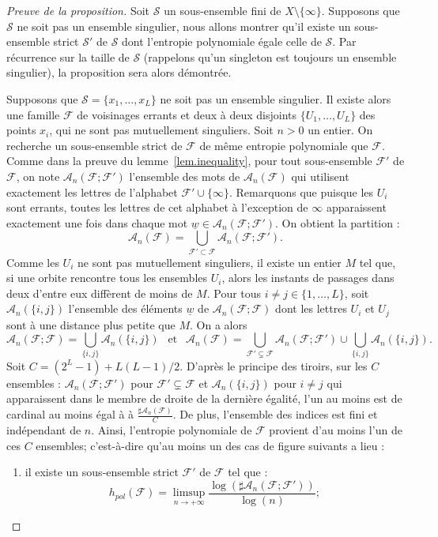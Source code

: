 \documentclass[11pt]{article}
\theoremstyle{definition}
\numberwithin{equation}{section}
\numberwithin{figure}{section}
\numberwithin{table}{section}
\newcommand*\cA{{\mathcal A}}
\newcommand*\cF{{\mathcal F}}
\newcommand*\cS{{\mathcal S}}
\begin{document}
\begin{proof}[Preuve de la proposition]
Soit $\cS$ un sous-ensemble fini de $X \setminus \{\infty\}$. Supposons que $\cS$ ne soit pas un ensemble singulier, nous allons montrer qu'il existe un sous-ensemble strict $\cS'$ de $\cS$ dont l'entropie polynomiale égale celle de $\cS$. Par récurrence sur la taille de $\cS$ (rappelons qu'un singleton est toujours un ensemble singulier), la proposition sera alors démontrée.

Supposons que $\cS=\{x_1, \dots, x_L\}$ ne soit pas un ensemble singulier. Il existe alors une famille $\cF$ de voisinages errants et deux à deux disjoints $\{U_1, \dots, U_L\}$ des points $x_i$, qui ne sont pas mutuellement singuliers. Soit $n>0$ un entier. On recherche un sous-ensemble strict de $\cF$ de même entropie polynomiale que $\cF$. Comme dans la preuve du lemme~\ref{lem.inequality}, pour tout sous-ensemble $\cF'$ de $\cF$, on note $\cA_n(\cF;\cF')$ l'ensemble des mots de $\cA_n(\cF)$ qui utilisent exactement les lettres de l'alphabet $\cF'\cup\{\infty\}$. Remarquons que puisque les $U_i$ sont errants, toutes les lettres de cet alphabet à l'exception de $\infty$ apparaissent exactement une fois {dans chaque mot $\underline{w} \in \cA_n(\cF;\cF')$}. On obtient la partition :
\[
\cA_n(\cF) = \bigcup_{\cF' \subset \cF} \cA_n(\cF; \cF').
\]
Comme les $U_i$ ne sont pas mutuellement singuliers, il existe un entier $M$ tel que, si une orbite rencontre tous les ensembles $U_i$, alors les instants de passages dans deux d'entre eux diffèrent de moins de $M$. Pour tous $i \neq j \in \{1, \dots, L\}$, soit $\cA_n(\{i,j\})$ l'ensemble des éléments $\underline{w}$ de $\cA_n(\cF;\cF)$ dont les lettres $U_i$ et $U_j$ sont à une distance plus petite que $M$. {On a alors}
\[
\cA_n(\cF;\cF) = \bigcup_{\{i,j\}} \cA_n(\{i,j\}) \ \ \text{ et } \ \
\cA_n(\cF) = \bigcup_{\cF' \subsetneq \cF} \cA_n(\cF; \cF') \cup \bigcup_{\{i,j\}} \cA_n(\{i,j\}).
\]
Soit $C = (2^L-1)+L(L-1)/2$. D'après le principe des tiroirs, sur les $C$ ensembles : $\cA_n(\cF;\cF')$ pour $\cF' \subsetneq \cF$ et $\cA_n(\{i,j\})$ pour $i\neq j$ qui apparaissent dans le membre de droite de la dernière égalité, {l'un au moins} est de cardinal {au moins égal à} à $\frac{\sharp \cA_n(\cF)}{C}$. De plus, l'ensemble des indices est fini et indépendant de $n$. Ainsi, l'entropie polynomiale de $\cF$ provient d'au moins l'un de ces $C$ ensembles; c'est-à-dire qu'au moins un {des cas de figure suivants} a lieu :
\begin{enumerate}
\item \label{item1} il existe un sous-ensemble strict $\cF'$ de $\cF$ tel que :
\begin{equation}\label{eq1}
h_{pol}(\cF)= \limsup_{n \to +\infty} \frac{\log(\sharp\cA_n(\cF;\cF'))}{\log(n)};
\end{equation}


\end{enumerate}
\end{proof}
\end{document}
